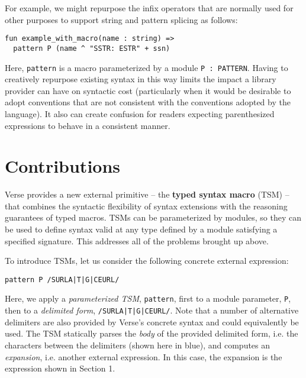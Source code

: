 \documentclass[preprint]{sigplanconf}
\begin{document}
For example, we might repurpose the infix operators that are normally used for other purposes to support string and pattern splicing as follows:

\begin{lstlisting}[numbers=none,escapechar=|]
fun example_with_macro(name : string) => 
  pattern P (name ^ "SSTR: ESTR" + ssn)
\end{lstlisting}
Here, \lstinline{pattern} is a macro parameterized by a module \lstinline{P : PATTERN}. Having to creatively repurpose existing syntax in this way limits the impact a library provider can have on syntactic cost (particularly when it would be desirable to adopt conventions that are not consistent with the conventions adopted by the language). It also can create confusion for readers expecting parenthesized expressions to behave in a consistent manner.

\section{Contributions}\label{sec:syntax-contributions}
Verse provides a new external primitive -- the \textbf{typed syntax macro} (TSM) -- that combines the syntactic flexibility of syntax extensions with the reasoning guarantees of typed macros. TSMs can be parameterized by modules, so they can be used to define syntax valid at any type defined by a module satisfying a specified signature. This addresses all of the problems brought up above.

To introduce TSMs, let us consider the following concrete external expression:
\begin{lstlisting}[numbers=none]
pattern P /SURLA|T|G|CEURL/
\end{lstlisting}
Here, we apply a \emph{parameterized TSM}, \lstinline{pattern}, first to a module parameter, \lstinline{P}, then to a \emph{delimited form}, \lstinline{/SURLA|T|G|CEURL/}. Note that a number of alternative delimiters are also provided by Verse's concrete syntax and could equivalently be used. The TSM statically parses the \emph{body} of the provided delimited form, i.e. the characters between the delimiters (shown here in blue), and computes an \emph{expansion}, i.e. another external expression. In this case, the expansion is the expression shown in Section 1.
\end{document}
